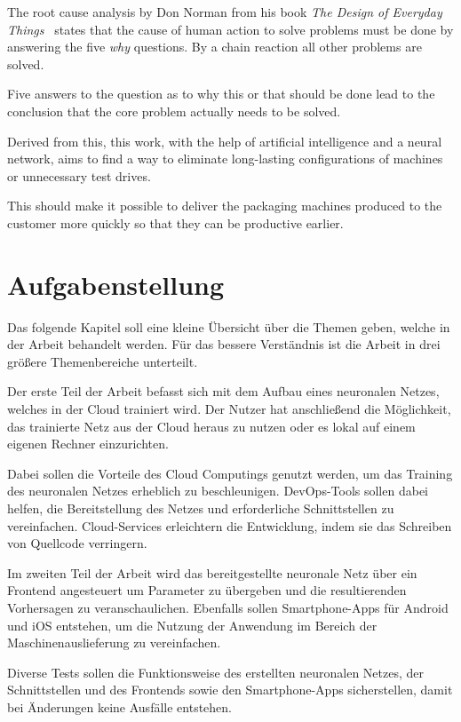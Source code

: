The root cause analysis by Don Norman from his book \textit{The Design of Everyday
Things}~\cite{book_einleitung_donnorman} states that the cause of human action to solve problems must be done by
answering the five \textit{why} questions. By a chain reaction all other problems are solved.

Five answers to the question as to why this or that should be done lead to the conclusion that the core problem actually
needs to be solved.

Derived from this, this work, with the help of artificial intelligence and a neural network, aims to find a way to
eliminate long-lasting configurations of machines or unnecessary test drives.

This should make it possible to deliver the packaging machines produced to the customer more quickly so that they can be
productive earlier.

\newpage

\section{Aufgabenstellung}
\label{sec:aufgabenstellung}
Das folgende Kapitel soll eine kleine Übersicht über die Themen geben, welche in der Arbeit behandelt werden. Für das
bessere Verständnis ist die Arbeit in drei größere Themenbereiche unterteilt.

Der erste Teil der Arbeit befasst sich mit dem Aufbau eines neuronalen Netzes, welches in der Cloud trainiert wird. Der
Nutzer hat anschließend die Möglichkeit, das trainierte Netz aus der Cloud heraus zu nutzen oder es lokal auf einem
eigenen Rechner einzurichten.

Dabei sollen die Vorteile des Cloud Computings genutzt werden, um das Training des neuronalen Netzes erheblich zu
beschleunigen. DevOps-Tools sollen dabei helfen, die Bereitstellung des Netzes und erforderliche Schnittstellen zu
vereinfachen. Cloud-Services erleichtern die Entwicklung, indem sie das Schreiben von Quellcode verringern.

Im zweiten Teil der Arbeit wird das bereitgestellte neuronale Netz über ein Frontend angesteuert um Parameter  zu
übergeben und die resultierenden Vorhersagen zu veranschaulichen. Ebenfalls sollen Smartphone-Apps für Android und iOS
entstehen, um die Nutzung der Anwendung im Bereich der Maschinenauslieferung zu vereinfachen.

Diverse Tests sollen die Funktionsweise des erstellten neuronalen Netzes, der Schnittstellen und des Frontends
sowie den Smartphone-Apps sicherstellen, damit bei Änderungen keine Ausfälle entstehen.

